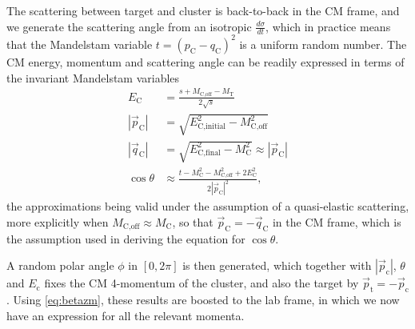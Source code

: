 The scattering between target and cluster is back-to-back in the CM frame, and we generate the scattering angle from an isotropic $\tfrac{d\sigma}{dt}$, which in practice means that the Mandelstam variable $t=(p_\text{C}-q_\text{C})^2$ is a uniform random number. The CM energy, momentum and scattering angle can be readily expressed in terms of the invariant Mandelstam variables%
\begin{align}
E_\text{C} &= \frac{s+M_\text{C,off} - M_\text{T}}{2\sqrt{s}} \\
|\vec{p}_\text{C}| &= \sqrt{E_\text{C,initial}^2 - M_\text{C,off}^2} \\
|\vec{q}_\text{C}| &= \sqrt{E_\text{C,final}^2 - M_\text{C}^2} \approx |\vec{p}_\text{C}|\\
\cos{\theta} &\approx \frac{t-M_\text{C}^2-M_\text{C,off}^2 + 2E_\text{C}^2}{2|\vec{p}_\text{C}|^2},
\end{align}
the approximations being valid under the assumption of a quasi-elastic scattering, more explicitly when $M_\text{C,off} \approx M_\text{C}$, so that $\vec{p}_\text{C} = -\vec{q}_\text{C}$ in the CM frame, which is the assumption used in deriving the equation for $\cos{\theta}$. %

A random polar angle $\phi$ in $[0,2\pi]$ is then generated, which together with $|\vec{p}_\text{c}|$, $\theta$ and $E_\text{c}$ fixes the CM 4-momentum of the cluster, and also the target by $\vec{p}_\text{t} = -\vec{p}_\text{c}$. Using \eqref{eq:betazm}, these results are boosted to the lab frame, in which we now have an expression for all the relevant momenta.

